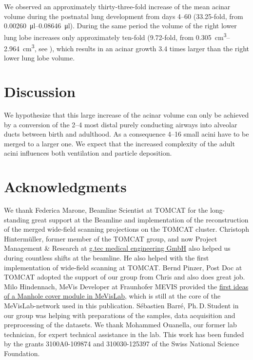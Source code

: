 \documentclass[%
	draft=false,
	paper=a4,%
	twoside=true,%
	draft=false,%
	abstract=false]{scrartcl}
\begin{document}
We observed an approximately thirty-three-fold increase of the mean acinar volume during the postnatal lung development from days \numrange{4}{60} (33.25-fold, from \SIrange{0.00260}{0.08646}{\micro\litre}). During the same period the volume of the right lower lung lobe increases only approximately ten-fold (9.72-fold, from \SIrange{0.305}{2.964}{\centi\metre\cubed}, see \cite{Tschanz2003}), which results in an acinar growth 3.4 times larger than the right lower lung lobe volume.

\section{Discussion}\label{sec:Discussion}
We hypothesize that this large increase of the acinar volume can only be achieved by a conversion of the \numrange{2}{4} most distal purely conducting airways into alveolar ducts between birth and adulthood. As a consequence \numrange{4}{16} small acini have to be merged to a larger one. We expect that the increased complexity of the adult acini influences both ventilation and particle deposition.

\section{Acknowledgments}
We thank Federica Marone, Beamline Scientist at TOMCAT for the long-standing great support at the Beamline and implementation of the reconstruction of the merged wide-field scanning projections on the TOMCAT cluster. Christoph Hinterm\"{u}ller, former member of the TOMCAT group, and now Project Management \& Research at \href{http://gtec.at/}{g.tec medical engineering GmbH} also helped us during countless shifts at the beamline. He also helped with the first implementation of wide-field scanning at TOMCAT. Bernd Pinzer, Post Doc at TOMCAT adopted the support of our group from Chris and also does great job. Milo Hindennach, MeVis Developer at Fraunhofer MEVIS provided the \href{http://www.mevis-research.de/cgi-bin/discus/board-auth.cgi?lm=1282233250&file=/839/11760.html}{first ideas of a Manhole cover module in MeVisLab}, which is still at the core of the MeVisLab-network used in this publication. Sébastien Barré, Ph.\,D.\,Student in our group was helping with preparations of the samples, data acquisition and preprocessing of the datasets. We thank Mohammed Ouanella, our former lab technician, for expert technical assistance in the lab. This work has been funded by the grants 3100A0-109874 and 310030-125397  of the Swiss National Science Foundation.
\end{document}
